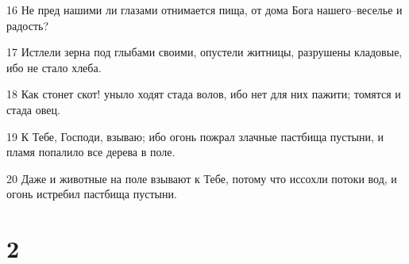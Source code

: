 \par 16 Не пред нашими ли глазами отнимается пища, от дома Бога нашего--веселье и радость?
\par 17 Истлели зерна под глыбами своими, опустели житницы, разрушены кладовые, ибо не стало хлеба.
\par 18 Как стонет скот! уныло ходят стада волов, ибо нет для них пажити; томятся и стада овец.
\par 19 К Тебе, Господи, взываю; ибо огонь пожрал злачные пастбища пустыни, и пламя попалило все дерева в поле.
\par 20 Даже и животные на поле взывают к Тебе, потому что иссохли потоки вод, и огонь истребил пастбища пустыни.

\chapter{2}

